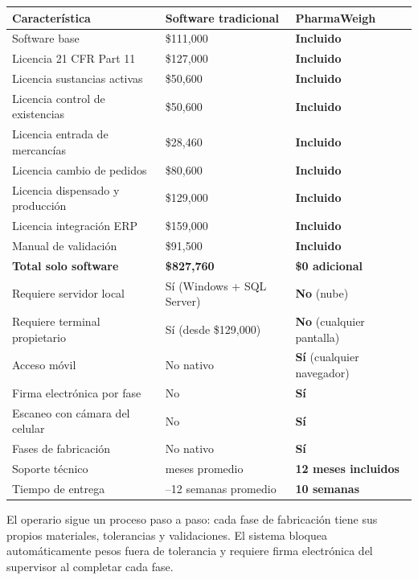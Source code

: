 \documentclass[11pt]{article}
\begin{document}
\begin{center}
\small
\begin{tabularx}{\linewidth}{@{}>{\raggedright\arraybackslash}p{4.5cm} >{\centering\arraybackslash}X >{\centering\arraybackslash}X@{}}
\toprule
\textbf{Característica} & \textbf{Software tradicional} & \textbf{PharmaWeigh} \\
\midrule
Software base & \$111,000 & \textbf{Incluido} \\
Licencia 21 CFR Part 11 & \$127,000 & \textbf{Incluido} \\
Licencia sustancias activas & \$50,600 & \textbf{Incluido} \\
Licencia control de existencias & \$50,600 & \textbf{Incluido} \\
Licencia entrada de mercancías & \$28,460 & \textbf{Incluido} \\
Licencia cambio de pedidos & \$80,600 & \textbf{Incluido} \\
Licencia dispensado y producción & \$129,000 & \textbf{Incluido} \\
Licencia integración ERP & \$159,000 & \textbf{Incluido} \\
Manual de validación & \$91,500 & \textbf{Incluido} \\
\midrule
\textbf{Total solo software} & \textbf{\$827,760} & \textbf{\$0 adicional} \\
\midrule
Requiere servidor local & Sí (Windows + SQL Server) & \textbf{No} (nube) \\
Requiere terminal propietario & Sí (desde \$129,000) & \textbf{No} (cualquier pantalla) \\
Acceso móvil & No nativo & \textbf{Sí} (cualquier navegador) \\
Firma electrónica por fase & No & \textbf{Sí} \\
Escaneo con cámara del celular & No & \textbf{Sí} \\
Fases de fabricación & No nativo & \textbf{Sí} \\
Soporte técnico & 3 meses promedio & \textbf{12 meses incluidos} \\
Tiempo de entrega & 10--12 semanas promedio & \textbf{10 semanas} \\
\bottomrule
\end{tabularx}
\end{center}


El operario sigue un proceso paso a paso: cada fase de fabricación tiene sus propios materiales, tolerancias y validaciones. El sistema bloquea automáticamente pesos fuera de tolerancia y requiere firma electrónica del supervisor al completar cada fase.
\end{document}
